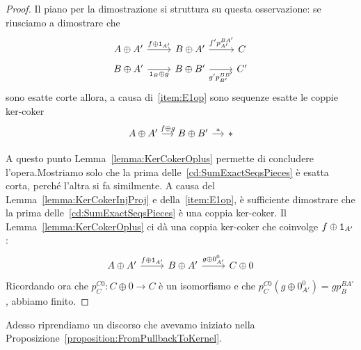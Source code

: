 \begin{proof}
  Il piano per la dimostrazione si struttura su questa osservazione: se
  riusciamo a dimostrare che
  \begin{equation}
    \begin{tikzcd}[row sep=tiny]
      A \oplus A' \ar["{f \oplus \id_{A'}}", r] & B \oplus A' \ar["{f' p_{A'}^{BA'}}",
      r] & C \\
      B \oplus A' \ar["{\id_B \oplus g}", r, swap] & B \oplus B' \ar["{g'
        p_{B'}^{BB'}}", r, swap] & C'
    \end{tikzcd}
    \label{cd:SumExactSeqsPieces}
  \end{equation}
  sono esatte corte allora, a causa di~\ref{item:E1op} sono sequenze
  esatte le coppie ker-coker
  \[
    \begin{tikzcd}[column sep=small, row sep=tiny]
      A \oplus A' \ar["{f \oplus g}", r] & B \oplus B' \ar["\ast",
      r] & \ast \\
    \end{tikzcd}
  \]
  A questo punto Lemma~\ref{lemma:KerCokerOplus} permette di concludere
  l'opera.\newline Mostriamo solo che la prima
  delle~\eqref{cd:SumExactSeqsPieces} è esatta corta, perché l'altra si
  fa similmente. A causa del Lemma~\ref{lemma:KerCokerInjProj} e
  della~\ref{item:E1op}, è sufficiente dimostrare che la prima
  delle~\ref{cd:SumExactSeqsPieces} è una coppia ker-coker. Il
  Lemma~\ref{lemma:KerCokerOplus} ci dà una coppia ker-coker che
  coinvolge \(f \oplus \mathtt 1_{A'}\):
  \[
    \begin{tikzcd}
      A \oplus A' \ar["{f \oplus \id_{A'}}", r] & B \oplus A' \ar["{g \oplus
        0_{A'}^0}", r] & C \oplus 0
    \end{tikzcd}
  \]
  Ricordando ora che \(p_{C}^{C0} : C \oplus 0 \to C\) è un isomorfismo e che
  \(p_{C}^{C0} \left( g \oplus 0_{A'}^0 \right) = g p_{B}^{BA'}\), abbiamo
  finito.
\end{proof}

Adesso riprendiamo un discorso che avevamo iniziato nella
Proposizione~\ref{proposition:FromPullbackToKernel}.


